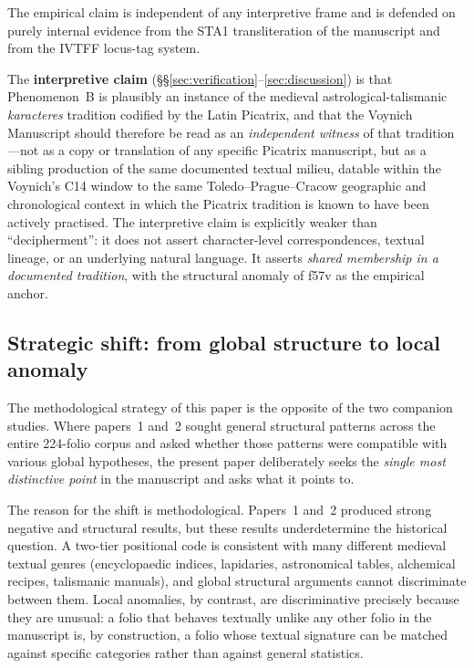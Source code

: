 The empirical claim is independent of any interpretive frame and is
defended on purely internal evidence from the STA1 transliteration of
the manuscript and from the IVTFF locus-tag system.

The \textbf{interpretive claim} (\S\S\ref{sec:verification}--\ref{sec:discussion})
is that Phenomenon~B is plausibly an instance of the medieval
astrological-talismanic \textit{karacteres} tradition codified by the
Latin Picatrix, and that the Voynich Manuscript should therefore be
read as an \emph{independent witness} of that tradition---not as a
copy or translation of any specific Picatrix manuscript, but as a
sibling production of the same documented textual milieu, datable
within the Voynich's C14 window to the same Toledo--Prague--Cracow
geographic and chronological context in which the Picatrix tradition
is known to have been actively practised. The interpretive claim is
explicitly weaker than ``decipherment'': it does not assert
character-level correspondences, textual lineage, or an underlying
natural language. It asserts \emph{shared membership in a documented
tradition}, with the structural anomaly of f57v as the empirical
anchor.

\subsection{Strategic shift: from global structure to local anomaly}
\label{sec:strategic_shift}

The methodological strategy of this paper is the opposite of the two
companion studies. Where papers~1 and~2 sought general structural
patterns across the entire 224-folio corpus and asked whether those
patterns were compatible with various global hypotheses, the present
paper deliberately seeks the \emph{single most distinctive point} in
the manuscript and asks what it points to.

The reason for the shift is methodological. Papers~1 and~2 produced
strong negative and structural results, but these results
underdetermine the historical question. A two-tier positional code
is consistent with many different medieval textual genres
(encyclopaedic indices, lapidaries, astronomical tables, alchemical
recipes, talismanic manuals), and global structural arguments cannot
discriminate between them. Local anomalies, by contrast, are
discriminative precisely because they are unusual: a folio that
behaves textually unlike any other folio in the manuscript is, by
construction, a folio whose textual signature can be matched against
specific categories rather than against general statistics.

